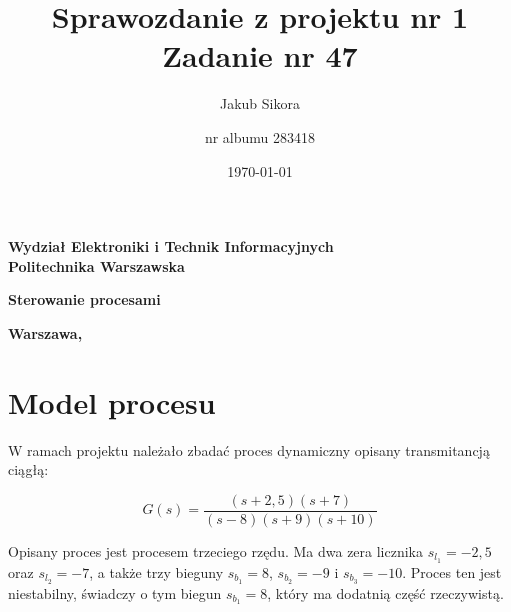\documentclass[a4paper,titlepage,11pt,floatssmall]{mwrep}
\title{\bf Sprawozdanie z projektu nr 1\\ Zadanie nr 47  \vskip 0.1cm}
\author{Jakub Sikora \and nr albumu 283418}
\date{\today}
\begin{document}
\makeatletter
\renewcommand{\maketitle}{\begin{titlepage}
		\begin{center}{\LARGE {\bf
					Wydział Elektroniki i Technik Informacyjnych}}\\
			\vspace{0.4cm}
			{\LARGE {\bf Politechnika Warszawska}}\\
			\vspace{0.3cm}
		\end{center}
		\vspace{5cm}
		\begin{center}
			{\bf \LARGE Sterowanie procesami \vskip 0.1cm}
		\end{center}
		\vspace{1cm}
		\begin{center}
			{\bf \LARGE \@title}
		\end{center}
		\vspace{2cm}
		\begin{center}
			{\bf \Large \@author \par}
		\end{center}
		\vspace*{\stretch{6}}
		\begin{center}
			\bf{\large{Warszawa, \@date\vskip 0.1cm}}
		\end{center}
	\end{titlepage}
	}
\makeatother
\maketitle

\tableofcontents


\chapter{Model procesu }
\indent{} W ramach projektu należało zbadać proces dynamiczny opisany transmitancją ciągłą:

\begin{equation*}
G(s) = \frac{(s + 2,5)(s + 7)}{(s - 8)(s + 9)(s + 10)} 
\end{equation*}

\indent{} Opisany proces jest procesem trzeciego rzędu. Ma dwa zera licznika $s_{l_1} = -2,5$ oraz  $s_{l_2} = -7$, a także trzy bieguny $s_{b_1} = 8$, $s_{b_2} = -9$ i $s_{b_3} = -10$. Proces ten jest niestabilny, świadczy o tym biegun $s_{b_1} = 8$, który ma dodatnią część rzeczywistą. 
\end{document}
